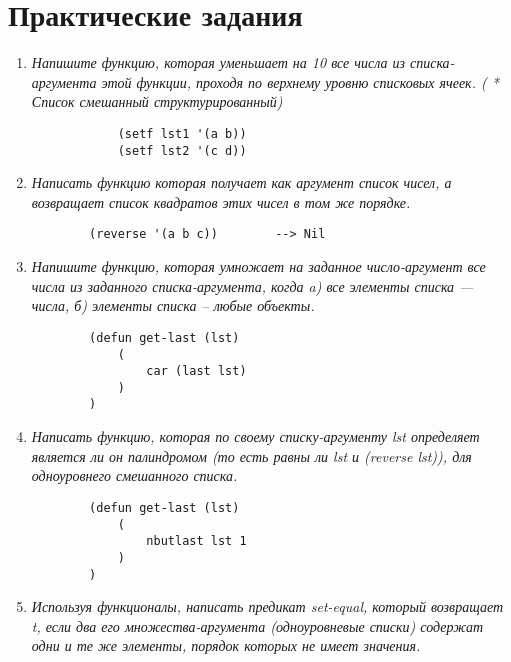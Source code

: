 \chapter{Практические задания}

\begin{enumerate}[wide=0pt]

	\item \textit{Напишите функцию, которая уменьшает на 10 все числа из списка-аргумента этой
	функции, проходя по верхнему уровню списковых ячеек. ( * Список смешанный
	структурированный)}

		\begin{lstlisting}
			(setf lst1 '(a b))
			(setf lst2 '(c d))
		\end{lstlisting}



	\item  \textit{Написать функцию которая получает как аргумент список чисел, а возвращает список
	квадратов этих чисел в том же порядке.}

	\begin{lstlisting}
		(reverse '(a b c))        --> Nil

	\end{lstlisting}

	\item  \textit{Напишите функцию, которая умножает на заданное число-аргумент все числа из
	заданного списка-аргумента, когда
	a) все элементы списка --- числа,
	б) элементы списка -- любые объекты.}

	\begin{lstlisting}
		(defun get-last (lst)
			(
				car (last lst)
			)
		)
	\end{lstlisting}



	\item  \textit{Написать функцию, которая по своему списку-аргументу lst определяет является ли он
	палиндромом (то есть равны ли lst и (reverse lst)), для одноуровнего смешанного
	списка.}

	\begin{lstlisting}
		(defun get-last (lst)
			(
				nbutlast lst 1
			)
		)
	\end{lstlisting}


	\item  \textit{Используя функционалы, написать предикат set-equal, который возвращает t, если два
	его множества-аргумента (одноуровневые списки) содержат одни и те же элементы,
	порядок которых не имеет значения.}
	

\end{enumerate}
